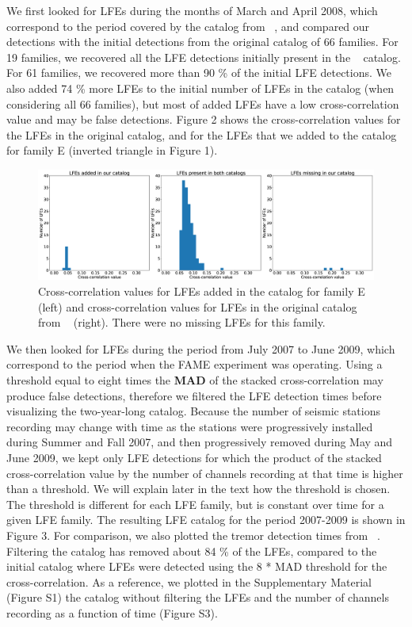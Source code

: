 \documentclass[draft]{agujournal2019}
\begin{document}
We first looked for LFEs during the months of March and April 2008, which correspond to the period covered by the catalog from ~, and compared our detections with the initial detections from the original catalog of 66 families. For 19 families, we recovered all the LFE detections initially present in the ~ catalog. For 61 families, we recovered more than 90 \% of the initial LFE detections. We also added 74 \% more LFEs to the initial number of LFEs in the catalog (when considering all 66 families), but most of added LFEs have a low cross-correlation value and may be false detections. Figure 2 shows the cross-correlation values for the LFEs in the original catalog, and for the LFEs that we added to the catalog for family E (inverted triangle in Figure 1). \\

\begin{figure}
\noindent\includegraphics[width=\textwidth, trim={0cm 0cm 25.5cm 0cm},clip]{figures/hist.eps}
\caption{Cross-correlation values for LFEs added in the catalog for family E (left) and cross-correlation values for LFEs in the original catalog from ~ (right). There were no missing LFEs for this family.}
\label{pngfiguresample}
\end{figure}

We then looked for LFEs during the period from July 2007 to June 2009, which correspond to the period when the FAME experiment was operating. Using a threshold equal to eight times the \textbf{MAD} of the stacked cross-correlation may produce false detections, therefore we filtered the LFE detection times before visualizing the two-year-long catalog. Because the number of seismic stations recording may change with time as the stations were progressively installed during Summer and Fall 2007, and then progressively removed during May and June 2009, we kept only LFE detections for which the product of the stacked cross-correlation value by the number of channels recording at that time is higher than a threshold. We will explain later in the text how the threshold is chosen. The threshold is different for each LFE family, but is constant over time for a given LFE family. The resulting LFE catalog for the period 2007-2009 is shown in Figure 3. For comparison, we also plotted the tremor detection times from ~. Filtering the catalog has removed about 84 \% of the LFEs, compared to the initial catalog where LFEs were detected using the 8 * MAD threshold for the cross-correlation. As a reference, we plotted in the Supplementary Material (Figure S1) the catalog without filtering the LFEs and the number of channels recording as a function of time (Figure S3). \\
\end{document}
